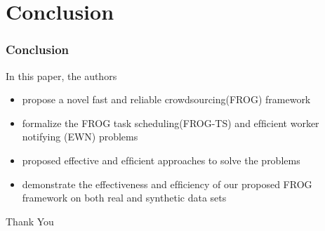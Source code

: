 \documentclass[UTF8]{beamer}
\begin{document}
\section{Conclusion}

\begin{frame}
    \frametitle{Conclusion}
    In this paper, the authors
    \begin{itemize}
        \item  propose a novel fast
        and reliable crowdsourcing(FROG) framework
        \item  formalize the FROG task scheduling(FROG-TS)
        and efﬁcient worker notifying (EWN) problems
        \item proposed effective and efﬁcient approaches
        to solve the problems
        \item demonstrate the effectiveness and efﬁciency 
        of our proposed FROG framework 
        on both real and synthetic data sets
    \end{itemize}
\end{frame}

\begin{frame}
    \begin{center}
        \Huge Thank You
    \end{center}
\end{frame}
\end{document}
